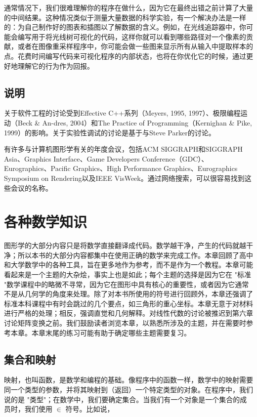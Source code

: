 \documentclass[lang=cn,10pt]{elegantbook}
\begin{document}
通常情况下，我们很难理解你的程序在做什么，因为它在最终出错之前计算了大量的中间结果。这种情况类似于测量大量数据的科学实验，有一个解决办法是一样的：为自己制作好的图表和插图以了解数据的含义。例如，在光线追踪器中，你可能会编写用于将光线树可视化的代码，这样你就可以看到哪些路径对一个像素的贡献，或者在图像重采样程序中，你可能会做一些图来显示所有从输入中提取样本的点。花费时间编写代码来可视化程序的内部状态，也将在你优化它的时候，通过更好地理解它的行为作为回报。


\section*{说明}
关于软件工程的讨论受到Effective C++系列（Meyers, 1995, 1997）、极限编程运动（Beck \& An-dres, 2004）和The Practice of Programming（Kernighan \& Pike, 1999）的影响。关于实验性调试的讨论是基于与Steve Parker的讨论。

有许多与计算机图形学有关的年度会议，包括ACM SIGGRAPH和SIGGRAPH Asia、Graphics Interface、Game Developers Conference（GDC）、Eurographics、Pacific Graphics、High Performance Graphics、Eurographics Symposium on Rendering以及IEEE VisWeek。通过网络搜索，可以很容易找到这些会议的名称。

\chapter{各种数学知识}

图形学的大部分内容只是将数学直接翻译成代码。数学越干净，产生的代码就越干净；所以本书的大部分内容都集中在使用正确的数学来完成工作。本章回顾了高中和大学数学中的各种工具，旨在更多地作为参考，而不是作为一个教程。本章可能看起来是一个主题的大杂烩，事实上也是如此；每个主题的选择是因为它在 "标准 "数学课程中的略微不寻常，因为它在图形中具有核心的重要性，或者因为它通常不是从几何学的角度来处理。除了对本书所使用的符号进行回顾外，本章还强调了标准本科课程中有时会跳过的几个要点，如三角形的重心坐标。本章无意于对材料进行严格的处理；相反，强调直觉和几何解释。对线性代数的讨论被推迟到第六章讨论矩阵变换之前。我们鼓励读者浏览本章，以熟悉所涉及的主题，并在需要时参考本章。本章末尾的练习可能有助于确定哪些主题需要复习。

\section{集合和映射}

映射，也叫函数，是数学和编程的基础。像程序中的函数一样，数学中的映射需要同一个类型的参数，并将其映射到（返回）一个特定类型的对象。在程序中，我们说的是 "类型"；在数学中，我们要确定集合。当我们有一个对象是一个集合的成员时，我们使用 $\in$ 符号。比如说，
\end{document}
